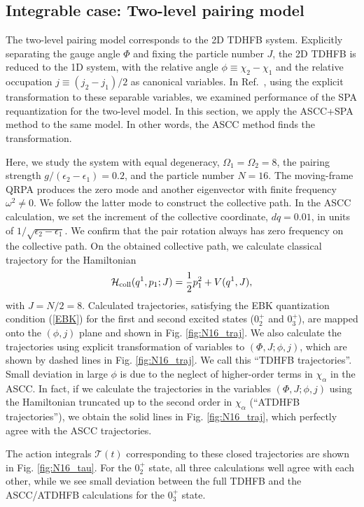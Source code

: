 \documentclass[%
superscriptaddress,
showpacs,
nofootinbib,
amsmath,amssymb,
aps,
prc,
twocolumn,
floatfix ]%
{revtex4-1}
\begin{document}
\subsection{Integrable case: Two-level pairing model}

The two-level pairing model corresponds to the 2D TDHFB system.
Explicitly separating the gauge angle $\Phi$ and
fixing the particle number $J$,
the 2D TDHFB is reduced to the 1D system,
with the relative angle $\phi\equiv \chi_2-\chi_1$ and the relative
occupation $j\equiv (j_2-j_1)/2$ as canonical variables.
In Ref.~\cite{NN18}, using the explicit transformation to these
separable variables,
we examined performance of the SPA requantization
for the two-level model.
In this section, we apply the ASCC+SPA method to the same model.
In other words, the ASCC method finds the transformation.

Here, we study the system with equal degeneracy,
$\Omega_1=\Omega_2=8$, 
the pairing strength $g/(\epsilon_2-\epsilon_1)=0.2$,
and the particle number $N=16$. 
The moving-frame QRPA produces the zero mode and another eigenvector
with finite frequency $\omega^2\neq 0$.
We follow the latter mode to construct the collective path.
In the ASCC calculation, we set the increment of the
collective coordinate, $dq=0.01$,
in units of $1/\sqrt{\epsilon_2-\epsilon_1}$.
We confirm that the pair rotation always has zero frequency
on the collective path.
On the obtained collective path, we calculate classical trajectory
for the Hamiltonian
\begin{equation}
\mathcal{H}_{\rm coll}(q^1,p_1;J)=\frac{1}{2} p_1^2 + V(q^1,J) ,
\end{equation}
with $J=N/2=8$.
Calculated trajectories, satisfying the EBK quantization condition
(\ref{EBK}) for the first and second excited states ($0_2^+$ and $0_3^+$),
are mapped onto the $(\phi,j)$ plane and
shown in Fig. \ref{fig:N16_traj}.
We also calculate the trajectories using explicit transformation
of variables to $(\Phi,J;\phi,j)$, which
are shown by dashed lines in Fig. \ref{fig:N16_traj}.
We call this ``TDHFB trajectories''.
Small deviation in large $\phi$ is due to the neglect of higher-order
terms in $\chi_\alpha$ in the ASCC.
In fact, if we calculate the trajectories in the variables
$(\Phi,J;\phi,j)$ using the Hamiltonian truncated up to the
second order in $\chi_\alpha$ (``ATDHFB trajectories''),
we obtain the solid lines in Fig. \ref{fig:N16_traj},
which perfectly agree with the ASCC trajectories.

The action integrals $\mathcal{T}(t)$ corresponding to
these closed trajectories are shown in Fig. \ref{fig:N16_tau}.
For the $0_2^+$ state,
all three calculations well agree
with each other, while we see small deviation between the full TDHFB
and the ASCC/ATDHFB calculations for the $0_3^+$ state.
\end{document}
